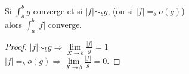 \documentclass[../main.tex]{subfile}
\begin{document}
\begin{theo}
	Si $\int_a^b g$ converge et si $|f| \sim_b g$, (ou si $|f| =_b o(g)$)\\ %
	alors $\int_a^b |f|$ converge.
\end{theo}

\begin{proof}
	$|f| \sim_b g \Rightarrow \lim\limits_{X \to b} \frac{|f|}{g} = 1$\\
	$|f| =_b o(g) \Rightarrow \lim\limits_{X \to b} \frac{|f|}{g} = 0$.
\end{proof}
\end{document}
